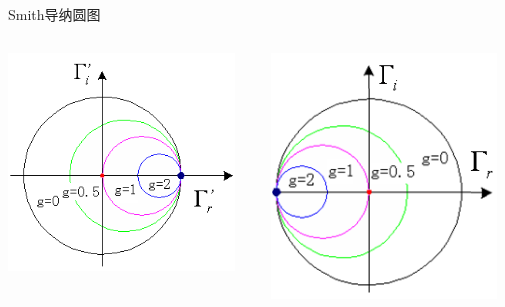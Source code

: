 \begin{frame}{Smith导纳圆图}
  \begin{columns}
    \begin{column}{0.5\linewidth}
      \includegraphics[width=6cm]{equal_G_circle1.png}
    \end{column}
    \begin{column}{0.5\linewidth}
      \includegraphics[width=6cm]{equal_G_circle2.png}
    \end{column}
  \end{columns}
  
  
\end{frame}

